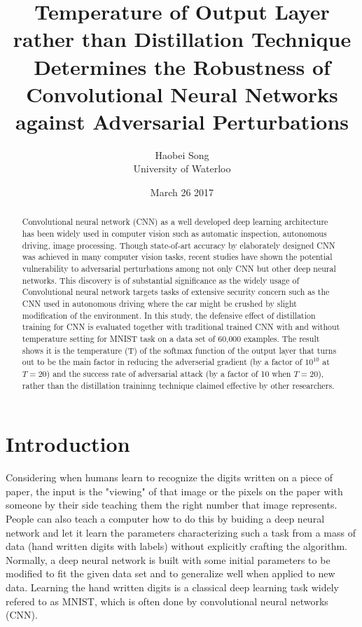 \documentclass{article}
\title{\textbf{Temperature of Output Layer rather than Distillation Technique Determines the Robustness of Convolutional Neural Networks against Adversarial Perturbations}}
\author{Haobei Song \\
        University of Waterloo}
\date{March 26 2017}
\begin{document}
\maketitle
{}
\newpage
{}

\begin{abstract}
	Convolutional neural network (CNN) as a well developed deep learning architecture has been widely used in computer vision such as automatic inspection, autonomous driving, image processing. 
	Though state-of-art accuracy by elaborately designed CNN was achieved in many computer vision tasks, 
	recent studies have shown the potential vulnerability to adversarial perturbations among not only CNN but other deep neural networks.
	This discovery is of substantial significance as the widely usage of Convolutional neural network targets tasks of extensive security concern
	such as the CNN used in autonomous driving where the car might be crushed by slight modification of the environment. 
	In this study, the defensive effect of distillation training for CNN is evaluated together with traditional trained CNN with and without temperature setting for MNIST task on a data set of 60,000 examples.
	The result shows it is the temperature (T) of the softmax function of the output layer that turns out to be the main factor in reducing the adverserial gradient (by a factor of $10^{10}$ at $T=20$) and the success rate of adversarial attack (by a factor of 10 when $T=20$),
 rather than the distillation traininng technique claimed effective by other researchers.
\end{abstract}
\section{Introduction}
Considering when humans learn to recognize the digits written on a piece of paper, the input is the "viewing" of that image or the pixels on the paper with someone by their side teaching them the right number that image represents.
People can also teach a computer how to do this by buiding a deep neural network and let it learn the parameters characterizing such a task from a mass of data (hand written digits with labels) without explicitly crafting the algorithm.
Normally, a deep neural network is built with some initial parameters to be modified to fit the given data set and to generalize well when applied to new data. Learning the hand written digits is a classical deep learning task widely refered to as MNIST, which is often done by convolutional neural networks (CNN).
\end{document}
